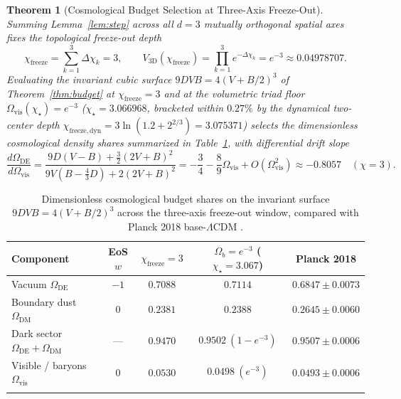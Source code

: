 \documentclass[pdflatex,sn-mathphys-num]{sn-jnl}
\theoremstyle{thmstyleone}
\newtheorem{theorem}{Theorem}
\theoremstyle{thmstyletwo}
\theoremstyle{thmstylethree}
\begin{document}
\begin{theorem}[Cosmological Budget Selection at Three-Axis Freeze-Out]\label{thm:freeze}
Summing Lemma~\ref{lem:step} across all $d=3$ mutually orthogonal spatial axes fixes the topological freeze-out depth
\begin{equation}\label{eq:chi_freeze}
\chi_{\mathrm{freeze}} = \sum_{k=1}^3 \Delta\chi_k = 3, \qquad V_{3\mathrm{D}}(\chi_{\mathrm{freeze}}) = \prod_{k=1}^3 e^{-\Delta\chi_k} = e^{-3} \approx 0.04978707.
\end{equation}
Evaluating the invariant cubic surface $9DVB = 4(V + B/2)^3$ of Theorem~\ref{thm:budget} at $\chi_{\mathrm{freeze}} = 3$ and at the volumetric triad floor $\Omega_{\mathrm{vis}}(\chi_\star) = e^{-3}$ ($\chi_\star = 3.066968$, bracketed within $0.27\%$ by the dynamical two-center depth $\chi_{\mathrm{freeze,dyn}} = 3\ln(1.2 + 2^{2/3}) = 3.075371$) selects the dimensionless cosmological density shares summarized in Table~\ref{tab:budget}, with differential drift slope
\begin{equation}\label{eq:drift_slope}
\frac{d\Omega_{\mathrm{DE}}}{d\Omega_{\mathrm{vis}}} = \frac{9D(V-B) + \frac{3}{2}(2V+B)^2}{9V(B - \frac{4}{3}D) + 2(2V+B)^2} = -\frac{3}{4} - \frac{8}{9}\Omega_{\mathrm{vis}} + O(\Omega_{\mathrm{vis}}^2) \approx -0.8057 \quad (\chi=3).
\end{equation}
\end{theorem}

\begin{table}[t]
\caption{Dimensionless cosmological budget shares on the invariant surface $9DVB = 4(V+B/2)^3$ across the three-axis freeze-out window, compared with Planck 2018 base-$\Lambda$CDM \cite{Planck2018}.}\label{tab:budget}
\begin{tabular}{@{}lcccc@{}}
\toprule
Component & EoS $w$ & $\chi_{\mathrm{freeze}}=3$ & $\Omega_b = e^{-3}$ ($\chi_\star=3.067$) & Planck 2018 \\
\midrule
Vacuum $\Omega_{\mathrm{DE}}$ & $-1$ & $0.7088$ & $0.7114$ & $0.6847 \pm 0.0073$ \\
Boundary dust $\Omega_{\mathrm{DM}}$ & $0$ & $0.2381$ & $0.2388$ & $0.2645 \pm 0.0060$ \\
Dark sector $\Omega_{\mathrm{DE}}+\Omega_{\mathrm{DM}}$ & --- & $0.9470$ & $0.9502\ (1 - e^{-3})$ & $0.9507 \pm 0.0006$ \\
Visible / baryons $\Omega_{\mathrm{vis}}$ & $0$ & $0.0530$ & $0.0498\ (e^{-3})$ & $0.0493 \pm 0.0006$ \\
\botrule
\end{tabular}
\end{table}
\end{document}
